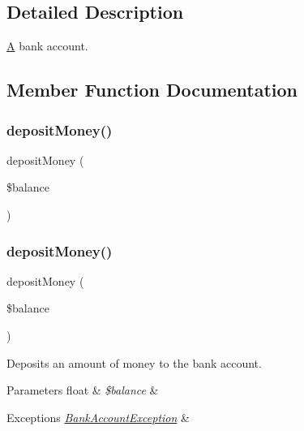 \subsection{Detailed Description}
\mbox{\hyperlink{class_a}{A}} bank account. 

\subsection{Member Function Documentation}
\mbox{\label{class_bank_account_aeb1e8e91e4a2b1543ae0644bd3723777}} 
\subsubsection{\texorpdfstring{deposit\+Money()}{depositMoney()}\hspace{0.1cm}{\footnotesize\ttfamily [1/2]}}
{\footnotesize\ttfamily deposit\+Money (\begin{DoxyParamCaption}\item[{}]{\$balance }\end{DoxyParamCaption})}

\mbox{\label{class_bank_account_aeb1e8e91e4a2b1543ae0644bd3723777}} 
\subsubsection{\texorpdfstring{deposit\+Money()}{depositMoney()}\hspace{0.1cm}{\footnotesize\ttfamily [2/2]}}
{\footnotesize\ttfamily deposit\+Money (\begin{DoxyParamCaption}\item[{}]{\$balance }\end{DoxyParamCaption})}

Deposits an amount of money to the bank account.


\begin{DoxyParams}[1]{Parameters}
float & {\em \$balance} & \\
\hline
\end{DoxyParams}

\begin{DoxyExceptions}{Exceptions}
{\em \mbox{\hyperlink{class_bank_account_exception}{Bank\+Account\+Exception}}} & \\
\hline
\end{DoxyExceptions}
\mbox{\label{class_bank_account_a75cc53ac692897a5cc38b0e92c28cbfb}} 
